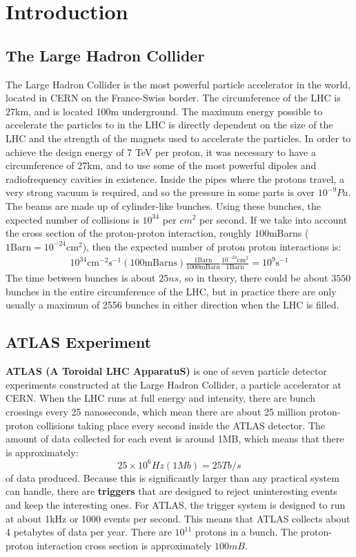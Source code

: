 \chapter{Introduction}
\section{The Large Hadron Collider}
The Large Hadron Collider is the most powerful particle accelerator in the world, located in CERN on the France-Swiss border.
The circumference of the LHC is 27km, and is located 100m underground. 
The maximum energy possible to accelerate the particles to in the LHC is directly dependent on the size of the LHC and the strength of the magnets used to accelerate the particles. 
In order to achieve the design energy of 7 TeV per proton, it was necessary to have a circumference of 27km, and to use some of the most powerful dipoles and radiofrequency cavities in existence. 
Inside the pipes where the protons travel, a very strong vacuum is required, and so the pressure in some parts is over $10^{-9}Pa$. 
The beams are made up of cylinder-like bunches. 
Using these bunches, the expected number of collisions is $10^{34}$ per $cm^2$ per second. If we take into account the cross section of the proton-proton interaction, roughly $100$mBarns ($1\textrm{Barn}=10^{-24}\textrm{cm}^{2}$), then the expected number of proton proton interactions is:
\begin{align}
10^{34}\textrm{cm}^{-2}\textrm{s}^{-1}(100\textrm{mBarns})\frac{1 \textrm{Barn}}{1000\textrm{mBarn}}\frac{10^{-24}\textrm{cm}^2}{1\textrm{Barn}}=10^{9}\textrm{s}^{-1}
		\label{proton-proton collisions per second}
\end{align}
The time between bunches is about $25ns$, so in theory, there could be about $3550$ bunches in the entire circumference of the LHC, but in practice there are only usually a maximum of 2556 bunches in either direction when the LHC is filled.
\section{ATLAS Experiment}
\textbf{ATLAS (A Toroidal LHC ApparatuS)} is one of seven particle detector experiments constructed at the Large Hadron Collider, a particle accelerator at CERN. 
When the LHC runs at full energy and intensity, there are bunch crossings every 25 nanoseconds, which mean there are about 25 million proton-proton collisions taking place every second inside the ATLAS detector. 
The amount of data collected for each event is around 1MB, which means that there is approximately:
$$25\times 10^6Hz(1Mb)=25Tb/s$$
of data produced. 
Because this is significantly larger than any practical system can handle, there are \textbf{triggers} that are designed to reject uninteresting events and keep the interesting ones. 
For ATLAS, the trigger system is designed to run at about 1kHz or 1000 events per second. 
This means that ATLAS collects about 4 petabytes of data per year. 
There are $10^{11}$ protons in a bunch. 
The proton-proton interaction cross section is approximately $100mB$.
